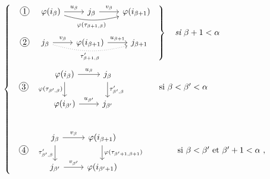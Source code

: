 \[
\left\{
\begin{array}{l}
\left.
\begin{array}{ll}
\circled{1} &
\begin{tikzcd}[ampersand replacement=\&]
\varphi(i_\beta) \arrow[r, "u_\beta"] \arrow[rr, bend right=15, "\varphi(\tau_{\beta+1,\beta})"'] \& j_\beta \arrow[r, "v_\beta"] \& \varphi(i_{\beta+1})
\end{tikzcd}
\\[5ex]
\circled{2} &
\begin{tikzcd}[ampersand replacement=\&]
j_\beta \arrow[r, "v_\beta"] \arrow[rr, dotted, bend right=15, "\tau'_{\beta+1,\beta}"'] \& \varphi(i_{\beta+1}) \arrow[r, "u_{\beta+1}"] \& j_{\beta+1}
\end{tikzcd}
\end{array}
\right\}\quad \textit{si}\ \beta+1<\alpha
\\[8ex]
\begin{array}{ll}
\circled{3} &
\begin{tikzcd}[ampersand replacement=\&]
\varphi(i_\beta) \arrow[r, "u_\beta"] \arrow[d, "\varphi(\tau_{\beta',\beta})"'] \& j_\beta \arrow[d, "\tau'_{\beta',\beta}"] \\
\varphi(i_{\beta'}) \arrow[r, "u_{\beta'}"] \& j_{\beta'}
\end{tikzcd}
\qquad\qquad \text{si } \beta<\beta'<\alpha
\end{array}
\\[10ex]
\begin{array}{ll}
\circled{4} &
\begin{tikzcd}[ampersand replacement=\&]
j_\beta \arrow[r, "v_\beta"] \arrow[d, "\tau'_{\beta',\beta}"'] \& \varphi(i_{\beta+1}) \arrow[d, "\varphi(\tau_{\beta'+1,\beta+1})"] \\
j_{\beta'} \arrow[r, "v_{\beta'}"] \& \varphi(i_{\beta'+1})
\end{tikzcd}
\qquad\qquad \text{si } \beta<\beta' \text{ et } \beta'+1<\alpha\ ,
\end{array}
\end{array}
\right.
\]


